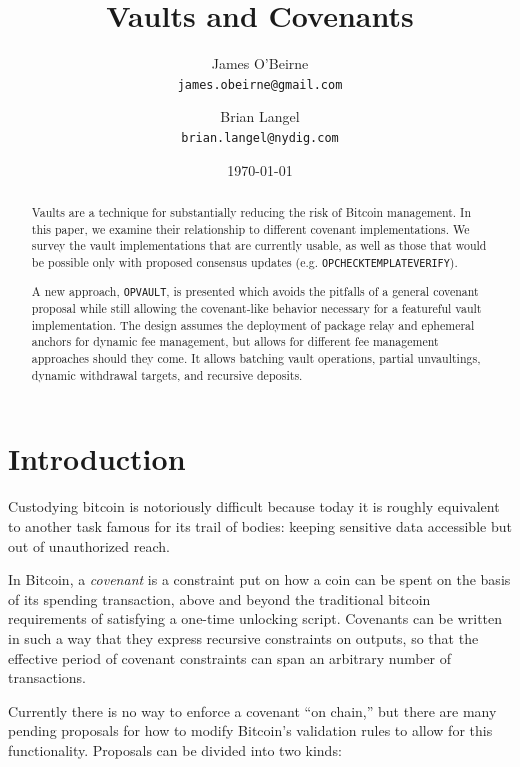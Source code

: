 \documentclass[10pt]{article}
\author{James O'Beirne \\
  \texttt{james.obeirne@gmail.com}
\and
  Brian Langel \\
  \texttt{brian.langel@nydig.com} \\}
\date{\today}
\title{Vaults and Covenants}
\begin{document}
\newcommand{\ctv}{\texttt{OP\textunderscore{}CHECKTEMPLATEVERIFY}}
\newcommand{\opv}{\texttt{OP\textunderscore{}VAULT}}
\newcommand{\opuv}{\texttt{OP\textunderscore{}UNVAULT}}
\newcommand{\spk}{\code{scriptPubKey}}
\newcommand{\code}[1]{\texttt{#1}}


\maketitle
\begin{abstract}

  Vaults are a technique for substantially reducing the risk of Bitcoin management. In
  this paper, we examine their relationship to different covenant implementations. We
  survey the vault implementations that are currently usable, as well as those that
  would be possible only with proposed consensus updates (e.g. \ctv{}). 

  A new approach, \opv{}, is presented which avoids the pitfalls of a general
  covenant proposal while still allowing the covenant-like behavior necessary for a
  featureful vault implementation. The design assumes the deployment of package relay
  and ephemeral anchors for dynamic fee management, but allows for different fee
  management approaches should they come. It allows batching vault operations, partial
  unvaultings, dynamic withdrawal targets, and recursive deposits.

\end{abstract}

\section*{Introduction}

Custodying bitcoin is notoriously difficult because today it is roughly equivalent to
another task famous for its trail of bodies: keeping sensitive data accessible but out
of unauthorized reach.

In Bitcoin, a \emph{covenant} is a constraint put on how a coin can be spent on the
basis of its spending transaction, above and beyond the traditional bitcoin
requirements of satisfying a one-time unlocking script. Covenants can be written in
such a way that they express recursive constraints on outputs, so that the effective
period of covenant constraints can span an arbitrary number of transactions. 

Currently there is no way to enforce a covenant ``on chain,'' but there are many
pending proposals for how to modify Bitcoin's validation rules to allow for this
functionality. Proposals can be divided into two kinds:
\end{document}
